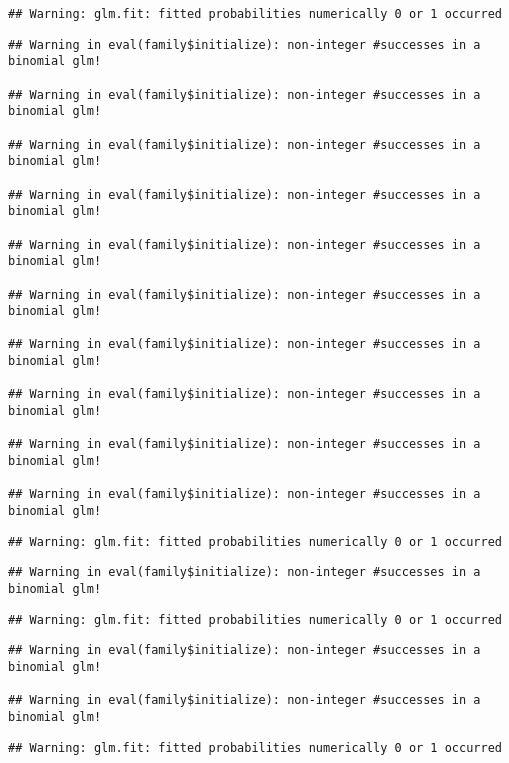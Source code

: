 \documentclass[
]{article}
\begin{document}
\begin{verbatim}
## Warning: glm.fit: fitted probabilities numerically 0 or 1 occurred
\end{verbatim}

\begin{verbatim}
## Warning in eval(family$initialize): non-integer #successes in a binomial glm!

## Warning in eval(family$initialize): non-integer #successes in a binomial glm!

## Warning in eval(family$initialize): non-integer #successes in a binomial glm!

## Warning in eval(family$initialize): non-integer #successes in a binomial glm!

## Warning in eval(family$initialize): non-integer #successes in a binomial glm!

## Warning in eval(family$initialize): non-integer #successes in a binomial glm!

## Warning in eval(family$initialize): non-integer #successes in a binomial glm!

## Warning in eval(family$initialize): non-integer #successes in a binomial glm!

## Warning in eval(family$initialize): non-integer #successes in a binomial glm!

## Warning in eval(family$initialize): non-integer #successes in a binomial glm!
\end{verbatim}

\begin{verbatim}
## Warning: glm.fit: fitted probabilities numerically 0 or 1 occurred
\end{verbatim}

\begin{verbatim}
## Warning in eval(family$initialize): non-integer #successes in a binomial glm!
\end{verbatim}

\begin{verbatim}
## Warning: glm.fit: fitted probabilities numerically 0 or 1 occurred
\end{verbatim}

\begin{verbatim}
## Warning in eval(family$initialize): non-integer #successes in a binomial glm!

## Warning in eval(family$initialize): non-integer #successes in a binomial glm!
\end{verbatim}

\begin{verbatim}
## Warning: glm.fit: fitted probabilities numerically 0 or 1 occurred
\end{verbatim}
\end{document}
